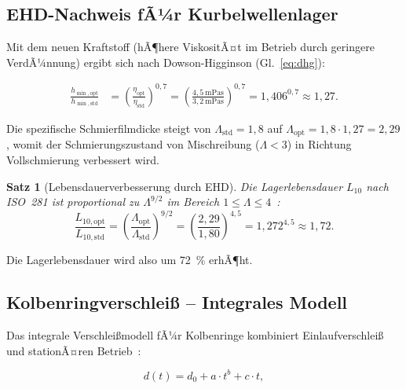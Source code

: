 ﻿\documentclass[12pt,a4paper]{article}
\newtheorem{theorem}{Satz}[section]
\begin{document}
\subsection{EHD-Nachweis fÃ¼r Kurbelwellenlager}
\label{sec:tribologie_ehd}

Mit dem neuen Kraftstoff (hÃ¶here ViskositÃ¤t im Betrieb durch geringere
VerdÃ¼nnung) ergibt sich nach Dowson-Higginson (Gl.~\eqref{eq:dhg}):

\begin{align}
  \frac{h_{\min,\mathrm{opt}}}{h_{\min,\mathrm{std}}}
  &= \left(\frac{\eta_{\mathrm{opt}}}{\eta_{\mathrm{std}}}\right)^{0{,}7}
   = \left(\frac{4{,}5\ \si{\milli\Pa\s}}{3{,}2\ \si{\milli\Pa\s}}\right)^{0{,}7}
   = 1{,}406^{0{,}7} \approx 1{,}27.
\end{align}

Die spezifische Schmierfilmdicke steigt von $\Lambda_{\mathrm{std}} = 1{,}8$
auf $\Lambda_{\mathrm{opt}} = 1{,}8 \cdot 1{,}27 = 2{,}29$, womit der
Schmierungszustand von Mischreibung ($\Lambda < 3$) in Richtung
Vollschmierung verbessert wird.

\begin{theorem}[Lebensdauerverbesserung durch EHD]
\label{thm:ehd_lebensdauer}
Die Lagerlebensdauer $L_{10}$ nach ISO~281 ist proportional zu
$\Lambda^{9/2}$ im Bereich $1 \leq \Lambda \leq 4$~\cite{ioannides1999}:
\begin{equation}
  \frac{L_{10,\mathrm{opt}}}{L_{10,\mathrm{std}}}
  = \left(\frac{\Lambda_{\mathrm{opt}}}{\Lambda_{\mathrm{std}}}\right)^{9/2}
  = \left(\frac{2{,}29}{1{,}80}\right)^{4{,}5}
  = 1{,}272^{4{,}5} \approx 1{,}72.
\end{equation}
\end{theorem}

Die Lagerlebensdauer wird also um \SI{72}{\percent} erhÃ¶ht.

\subsection{Kolbenringverschlei\ss{} -- Integrales Modell}
\label{sec:tribologie_kolben}

Das integrale Verschlei\ss{}modell fÃ¼r Kolbenringe kombiniert
Einlaufverschlei\ss{} und stationÃ¤ren Betrieb~\cite{taylor1998}:

\begin{equation}
  d(t) = d_0 + a \cdot t^b + c \cdot t,
  \label{eq:kolbenring_verschleiss}
\end{equation}
\end{document}
